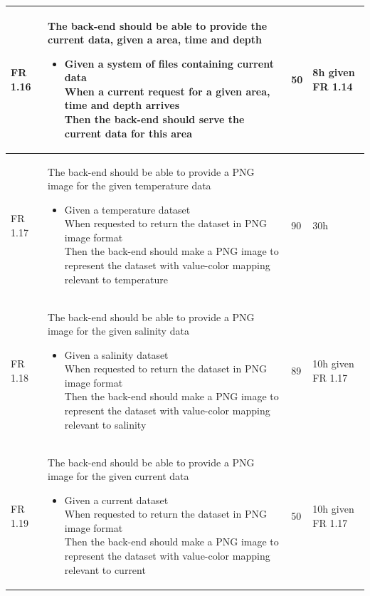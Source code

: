 \documentclass[11pt,a4paper,titlepage,oneside]{report}
\begin{document}
\begin{longtable}{p{1.4cm} p{7.8cm} p{1cm} p{1cm} }
  FR 1.16 & The back-end should be able to provide the current data, given a area, time and depth
  \begin{itemize}
  \item \parbox[t]{6.8cm}{
        Given a system of files containing current data \\
        When a current request for a given area, time and depth arrives \\
        Then the back-end should serve the current data for this area}
  \end{itemize}
  & 50 & 8h given FR 1.14 \\ \hline

  FR 1.17 & The back-end should be able to provide a PNG image for the given temperature data
  \begin{itemize}
  \item \parbox[t]{6.8cm}{
        Given a temperature dataset \\
        When requested to return the dataset in PNG image format \\
        Then the back-end should make a PNG image to represent the dataset with value-color mapping relevant to temperature}
  \end{itemize}
  & 90 & 30h \\ \hline

  FR 1.18 & The back-end should be able to provide a PNG image for the given salinity data
  \begin{itemize}
  \item \parbox[t]{6.8cm}{
        Given a salinity dataset \\
        When requested to return the dataset in PNG image format \\
        Then the back-end should make a PNG image to represent the dataset with value-color mapping relevant to salinity}
  \end{itemize}
  & 89 & 10h given FR 1.17 \\ \hline

  FR 1.19 & The back-end should be able to provide a PNG image for the given current data
  \begin{itemize}
  \item \parbox[t]{6.8cm}{
        Given a current dataset \\
        When requested to return the dataset in PNG image format \\
        Then the back-end should make a PNG image to represent the dataset with value-color mapping relevant to current}
  \end{itemize}
  & 50 & 10h given FR 1.17  \\ \hline


\end{longtable}
\end{document}
